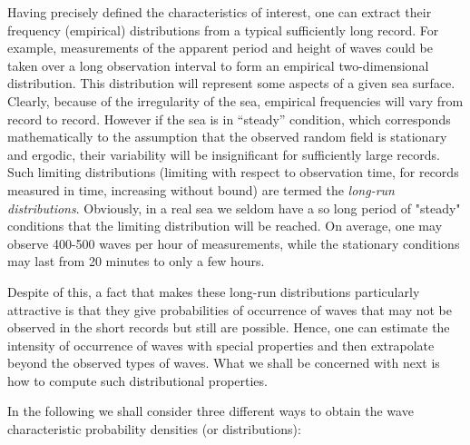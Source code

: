 Having precisely defined the characteristics of interest, one can
extract their frequency (empirical) distributions from a typical
sufficiently long record.  For example, measurements of the apparent
period and height of waves could be taken over a long
observation interval to form an empirical two-dimensional
distribution. This distribution will represent some aspects of a given
sea surface. Clearly, because of the irregularity of the sea,
empirical frequencies will vary from record to record. However if the
sea is in ``steady'' condition, which corresponds mathematically to
the assumption that the observed random field is stationary and
ergodic, their variability will be insignificant for sufficiently
large records. Such limiting distributions (limiting with respect to
observation time, for records measured in time, increasing without
bound) are termed the
{\em long-run distributions}. 
Obviously, in a real 
sea we seldom have a so long period of "steady" conditions that the
limiting distribution will be reached. On average, one may observe
400-500 waves per hour of measurements, while the stationary
conditions may last from 20 minutes to only a few hours.

Despite of this, a fact that makes these long-run distributions particularly
attractive is that they give probabilities of occurrence of waves that
may not be observed in the short records but still are possible. Hence,
one can estimate the intensity of occurrence of waves with special
properties and then extrapolate beyond the observed types of waves.
What we shall be concerned with next is how to compute such
distributional properties.

In the following we shall consider three different ways to
obtain the wave characteristic probability densities (or
distributions):

